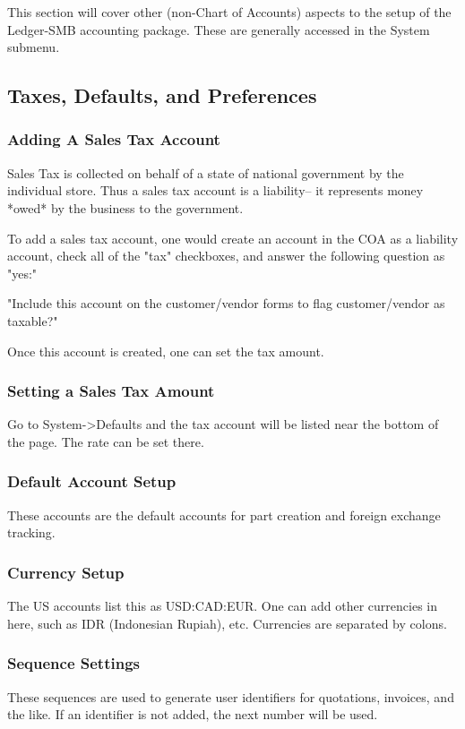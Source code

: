 \documentclass{article}
\begin{document}
This section will cover other (non-Chart of Accounts) aspects to the setup of
the Ledger-SMB accounting package.  These are generally accessed in the System 
submenu.

\subsection{Taxes, Defaults, and Preferences}
\subsubsection{Adding A Sales Tax Account}

Sales Tax is collected on behalf of a state of national government by the
individual store.  Thus a sales tax account is a liability-- it represents money
*owed* by the business to the government.

To add a sales tax account, one would create an account in the COA as a
liability account, check all of the "tax" checkboxes, and answer the following
question as "yes:"

"Include this account on the customer/vendor forms to flag customer/vendor as
taxable?" 

Once this account is created, one can set the tax amount.

\subsubsection{Setting a Sales Tax Amount}
Go to System-\textgreater Defaults and the tax account will be listed near the bottom of the
page.  The rate can be set there.

\subsubsection{Default Account Setup}
These accounts are the default accounts for part creation and foreign exchange
tracking.

\subsubsection{Currency Setup}
The US accounts list this as USD:CAD:EUR.  One can add other currencies in here,
such as IDR (Indonesian Rupiah), etc.  Currencies are separated by colons.

\subsubsection{Sequence Settings}
These sequences are used to generate user identifiers for quotations, invoices,
and the like.  If an identifier is not added, the next number will be used.
\end{document}
